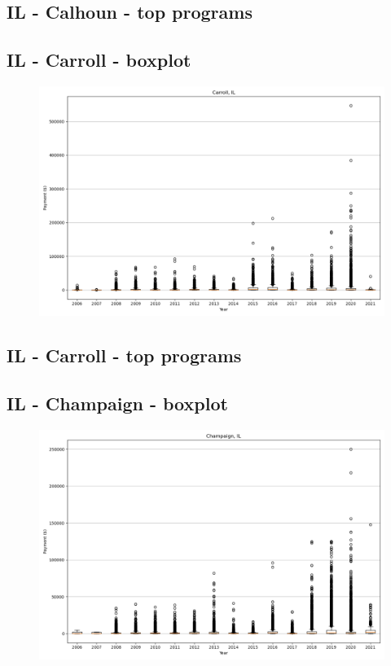 \subsection*{IL - Calhoun - top programs}

\newpage
\subsection*{IL - Carroll - boxplot}
\begin{figure}[h]
\centering
\includegraphics[width=7in]{../output/boxplots/counties/Carroll-IL_boxplot.png}
\end{figure}


\subsection*{IL - Carroll - top programs}

\newpage
\subsection*{IL - Champaign - boxplot}
\begin{figure}[h]
\centering
\includegraphics[width=7in]{../output/boxplots/counties/Champaign-IL_boxplot.png}
\end{figure}


